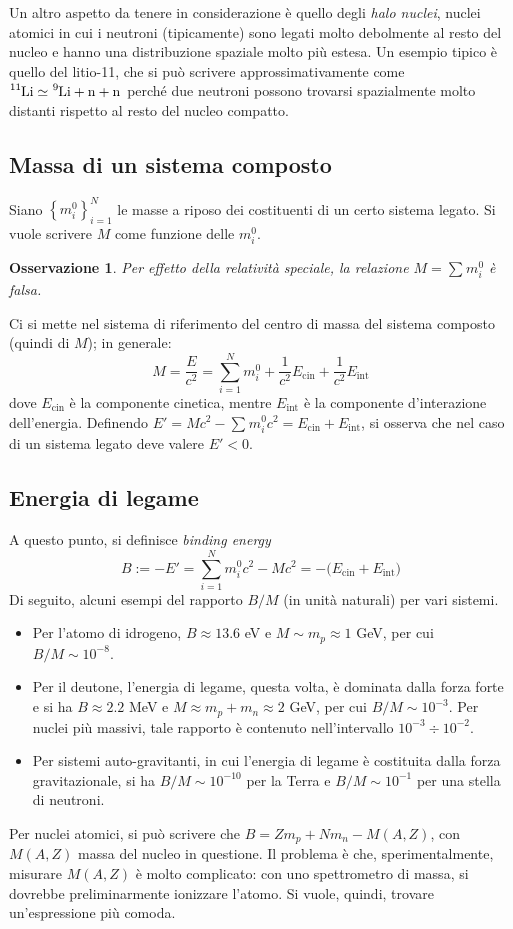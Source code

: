 \documentclass[11pt, a4paper]{scrartcl}
\theoremstyle{style}
\newtheorem{osservazione}{Osservazione}[section]
\numberwithin{equation}{subsection}
\begin{document}
Un altro aspetto da tenere in considerazione \`e quello degli \textit{halo nuclei}, nuclei atomici in cui i neutroni (tipicamente) sono legati molto debolmente al resto del nucleo e hanno una distribuzione spaziale molto pi\`u estesa.
Un esempio tipico \`e quello del litio-11, che si pu\`o scrivere approssimativamente come $\ce{^11Li} \simeq \ce{^9Li + n + n}$ perch\'e due neutroni possono trovarsi spazialmente molto distanti rispetto al resto del nucleo compatto.

\subsection{Massa di un sistema composto}
Siano $\left\{ m_i^0 \right\}_{i=1}^N $ le masse a riposo dei costituenti di un certo sistema legato. 
Si vuole scrivere $M$ come funzione delle $m_i^0$.
\begin{osservazione}
Per effetto della relativit\`a speciale, la relazione $M = \sum_{}^{} m_i^0$ \`e falsa.
\end{osservazione}
\noindent Ci si mette nel sistema di riferimento del centro di massa del sistema composto (quindi di $M$); in generale:
\[
M = \frac{E}{c^2} = \sum_{i=1}^{N} m_i^0 + \frac{1}{c^2}E_\text{cin} + \frac{1}{c^2} E_\text{int}
\] 
dove $E_\text{cin}$ \`e la componente cinetica, mentre $E_\text{int}$ \`e la componente d'interazione dell'energia.
Definendo $E' = Mc^2 - \sum_{}^{} m_i^0 c^2 = E_\text{cin} + E_\text{int}$, si osserva che nel caso di un sistema legato deve valere $E' < 0$.

\subsection{Energia di legame}

A questo punto, si definisce \textit{binding energy} 
\begin{equation}
B := - E' = \sum_{i=1}^{N} m_i^0 c^2 - Mc^2 = - \big(E_\text{cin} + E_\text{int}\big)
\end{equation}
Di seguito, alcuni esempi del rapporto $B / M$ (in unit\`a naturali) per vari sistemi.
\begin{itemize}
	\item Per l'atomo di idrogeno, $B \approx 13.6$ eV e $M\sim m_p \approx 1$ GeV, per cui $B / M \sim 10^{-8}$.
	\item Per il deutone, l'energia di legame, questa volta, \`e dominata dalla forza forte e si ha $B \approx 2.2$ MeV e $M \approx m_p + m_n \approx 2$ GeV, per cui $B/M \sim 10^{-3}$.
		Per nuclei pi\`u massivi, tale rapporto \`e contenuto nell'intervallo $10^{-3} \div 10^{-2}$.
	\item Per sistemi auto-gravitanti, in cui l'energia di legame \`e costituita dalla forza gravitazionale, si ha $B / M \sim 10^{-10}$ per la Terra e $B / M \sim 10^{-1}$ per una stella di neutroni.
\end{itemize}
Per nuclei atomici, si pu\`o scrivere che $B = Z m_p + N m_n - M(A,Z)$, con $M(A,Z)$ massa del nucleo in questione.
Il problema \`e che, sperimentalmente, misurare $M(A,Z)$ \`e molto complicato: con uno spettrometro di massa, si dovrebbe preliminarmente ionizzare l'atomo.
Si vuole, quindi, trovare un'espressione pi\`u comoda.
\end{document}
